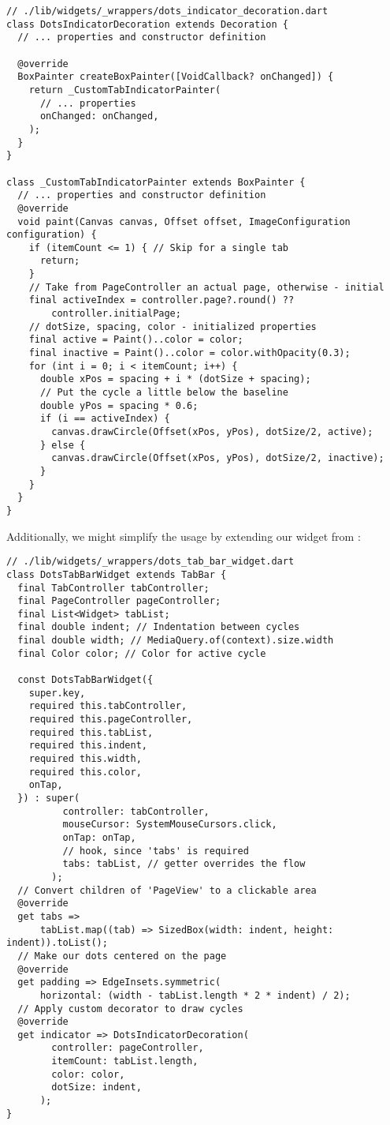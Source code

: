 \begin{lstlisting}
// ./lib/widgets/_wrappers/dots_indicator_decoration.dart
class DotsIndicatorDecoration extends Decoration {
  // ... properties and constructor definition

  @override
  BoxPainter createBoxPainter([VoidCallback? onChanged]) {
    return _CustomTabIndicatorPainter(
      // ... properties
      onChanged: onChanged,
    );
  }
}

class _CustomTabIndicatorPainter extends BoxPainter {
  // ... properties and constructor definition
  @override
  void paint(Canvas canvas, Offset offset, ImageConfiguration configuration) {
    if (itemCount <= 1) { // Skip for a single tab
      return;
    }
    // Take from PageController an actual page, otherwise - initial
    final activeIndex = controller.page?.round() ?? 
        controller.initialPage;
    // dotSize, spacing, color - initialized properties
    final active = Paint()..color = color;
    final inactive = Paint()..color = color.withOpacity(0.3);
    for (int i = 0; i < itemCount; i++) {
      double xPos = spacing + i * (dotSize + spacing);
      // Put the cycle a little below the baseline
      double yPos = spacing * 0.6; 
      if (i == activeIndex) {
        canvas.drawCircle(Offset(xPos, yPos), dotSize/2, active);
      } else {
        canvas.drawCircle(Offset(xPos, yPos), dotSize/2, inactive);
      }
    }
  }
}
\end{lstlisting}

\noindent Additionally, we might simplify the usage by extending our widget from :

\begin{lstlisting}
// ./lib/widgets/_wrappers/dots_tab_bar_widget.dart
class DotsTabBarWidget extends TabBar {
  final TabController tabController;
  final PageController pageController;
  final List<Widget> tabList;
  final double indent; // Indentation between cycles
  final double width; // MediaQuery.of(context).size.width
  final Color color; // Color for active cycle

  const DotsTabBarWidget({
    super.key,
    required this.tabController,
    required this.pageController,
    required this.tabList,
    required this.indent,
    required this.width,
    required this.color,
    onTap,
  }) : super(
          controller: tabController,
          mouseCursor: SystemMouseCursors.click,
          onTap: onTap,
          // hook, since 'tabs' is required
          tabs: tabList, // getter overrides the flow
        );
  // Convert children of 'PageView' to a clickable area 
  @override
  get tabs =>
      tabList.map((tab) => SizedBox(width: indent, height: indent)).toList();
  // Make our dots centered on the page
  @override
  get padding => EdgeInsets.symmetric(
      horizontal: (width - tabList.length * 2 * indent) / 2);
  // Apply custom decorator to draw cycles
  @override
  get indicator => DotsIndicatorDecoration(
        controller: pageController,
        itemCount: tabList.length,
        color: color,
        dotSize: indent,
      );
}
\end{lstlisting}

